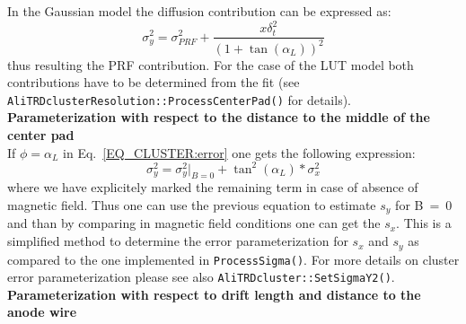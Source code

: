 \documentclass{alicetdr}
\begin{document}
In the Gaussian model the diffusion contribution can be expressed as:
\begin{equation}
\sigma^{2}_{y} = \sigma^{2}_{PRF} + \frac{x\delta_{t}^{2}}{(1+\tan(\alpha_{L}))^{2}}
\end{equation}
thus resulting the PRF contribution. For the case of the LUT model both contributions 
have to be determined from the fit (see {\tt AliTRDclusterResolution::ProcessCenterPad()} 
for details).
\\

\noindent
{\bf Parameterization with respect to the distance to the middle of the center pad}
\\

If $\phi = \alpha_L$ in Eq.~\ref{EQ_CLUSTER:error}  one gets the following expression:
\begin{equation}\label{EQ_CLUSTER:errorPhiAlpha}
\sigma_{y}^{2} = \sigma_{y}^{2}|_{B=0} + \tan^{2}(\alpha_{L})*\sigma_{x}^{2}
\end{equation}
where we have explicitely marked the remaining term in case of absence of magnetic 
field. Thus one can use the previous equation to estimate $s_y$ for B~=~0 and than 
by comparing in magnetic field conditions one can get the $s_x$. This is a simplified 
method to determine the error parameterization for $s_x$ and $s_y$ as compared to the one 
implemented in {\tt ProcessSigma()}. For more details on cluster error 
parameterization please see also {\tt AliTRDcluster::SetSigmaY2()}.
\\

\noindent
{\bf Parameterization with respect to drift length and distance to the anode wire}
\\
\end{document}
